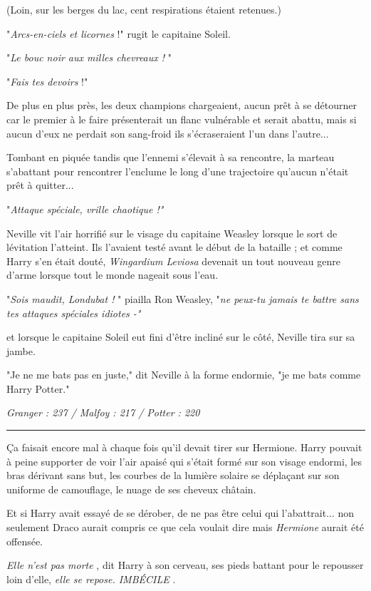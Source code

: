 (Loin, sur les berges du lac, cent respirations étaient retenues.)

"\emph{Arcs-en-ciels et licornes } !" rugit le capitaine Soleil.

"\emph{Le bouc noir aux milles chevreaux !} "

"\emph{Fais tes devoirs } !"

De plus en plus près, les deux champions chargeaient, aucun prêt à se détourner car le premier à le faire présenterait un flanc vulnérable et serait abattu, mais si aucun d'eux ne perdait son sang-froid ils s'écraseraient l'un dans l'autre...

Tombant en piquée tandis que l'ennemi s'élevait à sa rencontre, la marteau s'abattant pour rencontrer l'enclume le long d'une trajectoire qu'aucun n'était prêt à quitter...

"\emph{Attaque spéciale, vrille chaotique !"} 

Neville vit l'air horrifié sur le visage du capitaine Weasley lorsque le sort de lévitation l'atteint. Ils l'avaient testé avant le début de la bataille ; et comme Harry s'en était douté, \emph{Wingardium Leviosa}  devenait un tout nouveau genre d'arme lorsque tout le monde nageait sous l'eau.

"\emph{Sois maudit, Londubat !} " piailla Ron Weasley, "\emph{ne peux-tu jamais te battre sans tes attaques spéciales idiotes -"} 

et lorsque le capitaine Soleil eut fini d'être incliné sur le côté, Neville tira sur sa jambe.

"Je ne me bats pas en juste," dit Neville à la forme endormie, "je me bats comme Harry Potter."

\emph{Granger : 237 / Malfoy : 217 / Potter : 220} 
\par\noindent\rule{\textwidth}{0.4pt}
Ça faisait encore mal à chaque fois qu'il devait tirer sur Hermione. Harry pouvait à peine supporter de voir l'air apaisé qui s'était formé sur son visage endormi, les bras dérivant sans but, les courbes de la lumière solaire se déplaçant sur son uniforme de camouflage, le nuage de ses cheveux châtain.

Et si Harry avait essayé de se dérober, de ne pas être celui qui l'abattrait... non seulement Draco aurait compris ce que cela voulait dire mais \emph{Hermione}  aurait été offensée.

\emph{Elle n'est pas morte} , dit Harry à son cerveau, ses pieds battant pour le repousser loin d'elle, \emph{elle se repose. IMBÉCILE} .

